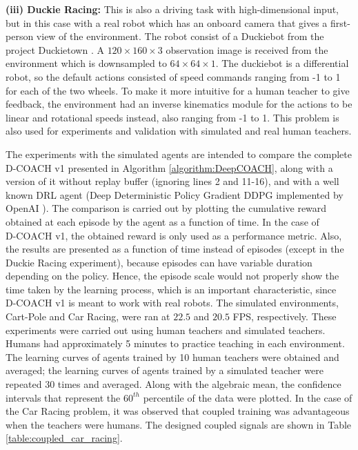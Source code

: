 \textbf{(iii) Duckie Racing:} This is also a driving task with high-dimensional input, but in this case with a real robot which has an onboard camera that gives a first-person view of the environment. The robot consist of a Duckiebot from the project Duckietown \cite{Paull2017}. A $120\times160\times3$ observation image is received from the environment which is downsampled to $64\times64\times1$. The duckiebot is a differential robot, so the default actions consisted of speed commands ranging from -1 to 1 for each of the two wheels. To make it more intuitive for a human teacher to give feedback, the environment had an inverse kinematics module for the actions to be linear and rotational speeds instead, also ranging from -1 to 1. This problem is also used for experiments and validation with simulated and real human teachers.

The experiments with the simulated agents are intended to compare the complete D-COACH v1 presented in Algorithm \ref{algorithm:DeepCOACH}, along with a version of it without replay buffer (ignoring lines 2 and 11-16), and with a well known DRL agent (Deep Deterministic Policy Gradient DDPG \cite{Lillicrap2015} implemented by OpenAI \cite{baselines}). The comparison is carried out by plotting the cumulative reward obtained at each episode by the agent as a function of time. In the case of $\text{D-COACH}$ v1, the obtained reward is only used as a performance metric. Also, the results are presented as a function of time instead of episodes (except in the Duckie Racing experiment), because episodes can have variable duration depending on the policy. Hence, the episode scale would not properly show the time taken by the learning process, which is an important characteristic, since $\text{D-COACH}$ v1 is meant to work with real robots. The simulated environments, Cart-Pole and Car Racing, were ran at $22.5$ and $20.5$ FPS, respectively. These experiments were carried out using human teachers and simulated teachers. Humans had approximately 5 minutes to practice teaching in each environment. The learning curves of agents trained by 10 human teachers were obtained and averaged; the learning curves of agents trained by a simulated teacher were repeated 30 times and averaged. Along with the algebraic mean, the confidence intervals that represent the $60^{th}$ percentile of the data were plotted. In the case of the Car Racing problem, it was observed that coupled training was advantageous when the teachers were humans. The designed coupled signals are shown in Table \ref{table:coupled_car_racing}.

